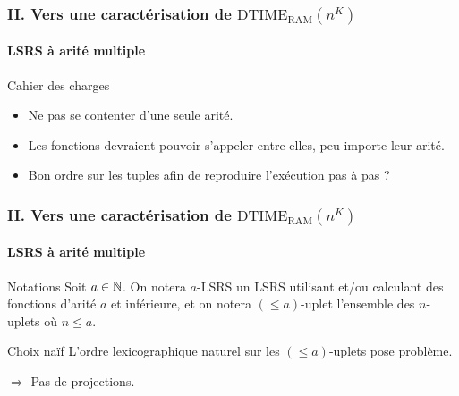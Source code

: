 \documentclass[10pt]{beamer}
\newcommand{\dtimeram}{\text{DTIME}_{\text{RAM}}\left( n^K \right)}
\newcommand{\leqa}{\left( \leqslant a \right)}
\begin{document}
	
	\begin{frame}
		\frametitle{II. Vers une caractérisation de $\dtimeram$}
		\framesubtitle{LSRS à arité multiple}
		
		
		\begin{block}{Cahier des charges}
			\begin{itemize}
				\item 	Ne pas se contenter d'une seule arité. %
				\pause 
				\item 	Les fonctions devraient pouvoir s'appeler entre elles, peu importe leur arité. %
				\item 	Bon ordre sur les tuples afin de reproduire l'exécution pas à pas ?
			\end{itemize}
		\end{block}
		
	\end{frame}
	
	
	\begin{frame}
		\frametitle{II. Vers une caractérisation de $\dtimeram$}
		\framesubtitle{LSRS à arité multiple}

		\begin{block}{Notations}
			Soit $a \in \mathbb{N}$. On notera $a$-LSRS un LSRS utilisant et/ou calculant des fonctions d'arité $a$ et inférieure, et on notera $\leqa$-uplet l'ensemble des $n$-uplets où $n \leqslant a$.
		\end{block}
		
		\pause 
		
		\begin{block}{Choix naïf}
			L'ordre lexicographique naturel sur les $\leqa$-uplets pose problème.
			
			$\Rightarrow$ Pas de projections.
		\end{block}
	\end{frame}
	
\end{document}
